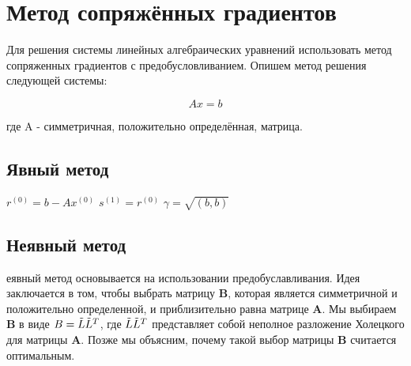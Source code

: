 \section{Метод сопряжённых градиентов}

Для решения системы линейных алгебраических уравнений использовать метод
сопряженных градиентов с предобусловливанием. Опишем метод решения следующей системы:

\[
  Ax = b
\]

где A - симметричная, положительно определённая, матрица.

\subsection{Явный метод}

\SetAlFnt{\normalsize}
\SetAlgoNoLine

\begin{algorithm*}[H]
  \DontPrintSemicolon
  $r^{(0)} = b - Ax^{(0)} $ \;
  $s^{(1)} = r^{(0)} $ \;
  $ \gamma = \sqrt{(b, b)} $

\end{algorithm*}

\subsection{Неявный метод}

еявный метод основывается на использовании предобуславливания. 
Идея заключается в том, чтобы выбрать матрицу \textbf{B}, которая является
симметричной и положительно определенной, и приблизительно равна 
матрице \textbf{A}. Мы выбираем \textbf{B} в виде
$B = \Tilde{L} \Tilde{L}^T $, где $\Tilde{L} \Tilde{L}^T$ представляет собой 
неполное разложение Холецкого для матрицы \textbf{A}.
Позже мы объясним, почему такой выбор матрицы \textbf{B} считается оптимальным.

